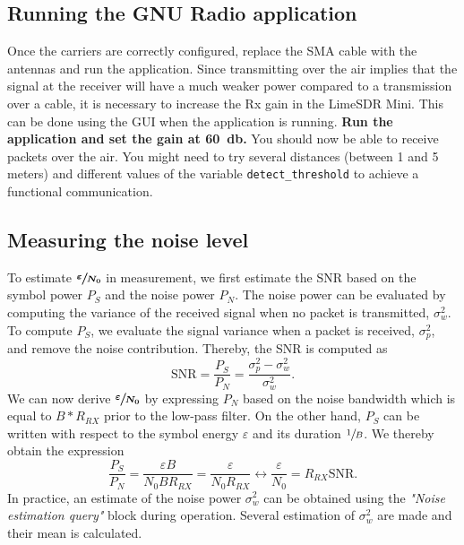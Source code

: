 \subsection{Running the GNU Radio application}

Once the carriers are correctly configured, replace the SMA cable with the antennas and run the application.
Since transmitting over the air implies that the signal at the receiver will have a much weaker power compared to a transmission over a cable,
it is necessary to increase the Rx gain in the LimeSDR Mini. This can be done using the GUI when the application is running. \textbf{Run the application and set the gain at \SI{60}{\decibel}.}
You should now be able to receive packets over the air.
You might need to try several distances (between 1 and 5 meters) and different values of the variable \texttt{detect\_threshold} to achieve a functional communication.

\subsection{Measuring the noise level}
\label{sec:appendix}

To estimate $\boldsymbol{\sfrac{\varepsilon}{N_0}}$ in measurement, we first estimate the SNR based on the symbol power $P_S$ and the noise power $P_N$. The noise power can be evaluated by computing the variance of the received signal when no packet is transmitted,  $\sigma_w^2$. To compute $P_S$, we evaluate the signal variance  when a packet is received, $\sigma_p^2$, and remove the noise contribution. Thereby, the SNR is computed as
\begin{equation}
    \textrm{SNR} = \frac{P_S}{P_N} = \frac{\sigma_p^2 - \sigma_w^2}{\sigma_w^2}.
\end{equation}
We can now derive $\boldsymbol{\sfrac{\varepsilon}{N_0}}$ by expressing $P_N$ based on the noise bandwidth which is equal to $B*R_{RX}$ prior to the low-pass filter. On the other hand, $P_S$ can be written with respect to the symbol energy $\varepsilon$ and its duration $\sfrac{1}{B}$. We thereby obtain the expression
\begin{equation}
    \frac{P_S}{P_N} = \frac{\varepsilon B}{N_0 B R_{RX}} = \frac{\varepsilon}{N_0 R_{RX}} \leftrightarrow \frac{\varepsilon}{N_0} = R_{RX}\textrm{SNR}.
\end{equation}
In practice, an estimate of the noise power $\sigma_w^2$ can be obtained using the \textit{"Noise estimation query"} block during operation. Several estimation of $\sigma_w^2$ are made and their mean is calculated.
